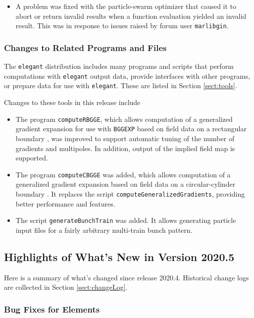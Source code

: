 \documentclass[11pt]{article}
\begin{document}
\begin{itemize}
\item A problem was fixed with the particle-swarm optimizer that caused it to abort or return invalid results when
  a function evaluation yielded an invalid result. This was in response to issues raised by forum user \verb|marlibgin|.
\end{itemize}

\subsubsection{Changes to Related Programs and Files}

The {\tt elegant} distribution includes many programs and scripts that perform computations with {\tt elegant}
output data, provide interfaces with other programs, or prepare data for use with {\tt elegant}. These
are listed in Section \ref{sect:tools}. 

Changes to these tools in this release include
\begin{itemize}
\item The program \verb|computeRBGGE|, which allows computation of a generalized gradient
  expansion\cite{Venturini-NIMA427-387} for use with \verb|BGGEXP| based on field data on a rectangular boundary
  \cite{Mitchell-2007}, was improved to support automatic tuning of the number of gradients and multipoles.
  In addition, output of the implied field map is supported.
\item The program \verb|computeCBGGE| was added, which allows computation of a generalized gradient expansion
  based on field data on a circular-cylinder boundary \cite{Venturini-NIMA427-387}. It replaces the script
  \verb|computeGeneralizedGradients|, providing better performance and features.
\item The script \verb|generateBunchTrain| was added. It allows generating particle input files for a fairly
  arbitrary multi-train bunch pattern.
\end{itemize}

\subsection{Highlights of What's New in Version 2020.5}

Here is a summary of what's changed since release 2020.4.  Historical change logs are collected in Section
\ref{sect:changeLog}.

\subsubsection{Bug Fixes for Elements}
\end{document}
